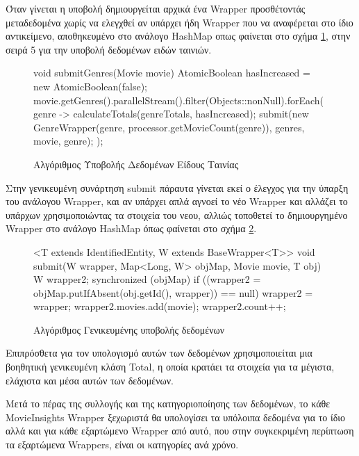 Όταν γίνεται η υποβολή δημιουργείται αρχικά ένα Wrapper προσθέτοντάς μεταδεδομένα χωρίς να ελεγχθεί αν υπάρχει ήδη Wrapper που να αναφέρεται στο ίδιο αντικείμενο, αποθηκευμένο στο ανάλογο HashMap οπως φαίνεται στο σχήμα \ref{code:submitGenre}, στην σειρά 5 για την υποβολή δεδομένων ειδών ταινιών.
\begin{figure}[h]
    \begin{javacode}
void submitGenres(Movie movie) {
    AtomicBoolean hasIncreased = new AtomicBoolean(false);
    movie.getGenres().parallelStream().filter(Objects::nonNull).forEach(genre -> {
        calculateTotals(genreTotals, hasIncreased);
        submit(new GenreWrapper(genre, processor.getMovieCount(genre)), genres, movie, genre);
    });
}
    \end{javacode}
    \caption{Αλγόριθμος Υποβολής Δεδομένων Είδους Ταινίας}
    \label{code:submitGenre}
\end{figure}

Στην γενικευμένη συνάρτηση submit πάραυτα γίνεται εκεί ο έλεγχος για την ύπαρξη του ανάλογου Wrapper, και αν υπάρχει απλά αγνοεί το νέο Wrapper και αλλάζει το υπάρχων χρησιμοποιώντας τα στοιχεία του νεου, αλλιώς τοποθετεί το δημιουργημένο Wrapper στο ανάλογο HashMap όπως φαίνεται στο σχήμα \ref{code:submit}.

\begin{figure}[h]
    \begin{javacode}
<T extends IdentifiedEntity, W extends BaseWrapper<T>> void submit(W wrapper, Map<Long, W> objMap, Movie movie, T obj) {
    W wrapper2;
    synchronized (objMap) {
        if ((wrapper2 = objMap.putIfAbsent(obj.getId(), wrapper)) == null) {
            wrapper2 = wrapper;
        }
    }
    wrapper2.movies.add(movie);
    wrapper2.count++;
}
    \end{javacode}
    \caption{Αλγόριθμος Γενικευμένης υποβολής δεδομένων}
    \label{code:submit}
\end{figure}

Επιπρόσθετα για τον υπολογισμό αυτών των δεδομένων χρησιμοποιείται μια βοηθητική γενικευμένη κλάση Total, η οποία κρατάει τα στοιχεία για τα μέγιστα, ελάχιστα και μέσα αυτών των δεδομένων. 

Μετά το πέρας της συλλογής και της κατηγοριοποίησης των δεδομένων, το κάθε MovieInsights Wrapper ξεχωριστά θα υπολογίσει τα υπόλοιπα δεδομένα για το ίδιο αλλά και για κάθε εξαρτώμενο Wrapper από αυτό, που στην συγκεκριμένη περίπτωση τα εξαρτώμενα Wrappers, είναι οι κατηγορίες ανά χρόνο.

